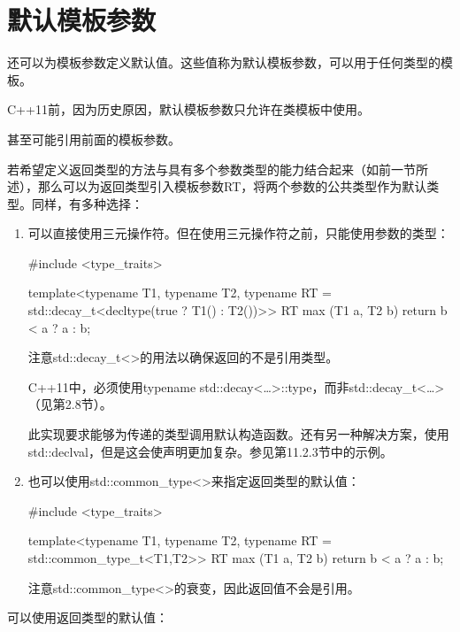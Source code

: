 \section{默认模板参数}

还可以为模板参数定义默认值。这些值称为默认模板参数，可以用于任何类型的模板。

\begin{notice}
C++11前，因为历史原因，默认模板参数只允许在类模板中使用。
\end{notice}

甚至可能引用前面的模板参数。

若希望定义返回类型的方法与具有多个参数类型的能力结合起来（如前一节所述），那么可以为返回类型引入模板参数RT，将两个参数的公共类型作为默认类型。同样，有多种选择：

\begin{enumerate}
\item 
可以直接使用三元操作符。但在使用三元操作符之前，只能使用参数的类型：

\begin{cpp}
#include <type_traits>

template<typename T1, typename T2,
typename RT = std::decay_t<decltype(true ? T1() : T2())>>
RT max (T1 a, T2 b)
{
	return b < a ? a : b;
}
\end{cpp}

注意std::decay\_t<>的用法以确保返回的不是引用类型。

\begin{notice}
C++11中，必须使用typename std::decay<…>::type，而非std::decay\_t<…>（见第2.8节）。
\end{notice}

此实现要求能够为传递的类型调用默认构造函数。还有另一种解决方案，使用std::declval，但是这会使声明更加复杂。参见第11.2.3节中的示例。

\item
也可以使用std::common\_type<>来指定返回类型的默认值：

\begin{cpp}
#include <type_traits>

template<typename T1, typename T2,
typename RT = std::common_type_t<T1,T2>>
RT max (T1 a, T2 b)
{
	return b < a ? a : b;
}
\end{cpp}

注意std::common\_type<>的衰变，因此返回值不会是引用。
\end{enumerate}

可以使用返回类型的默认值：

